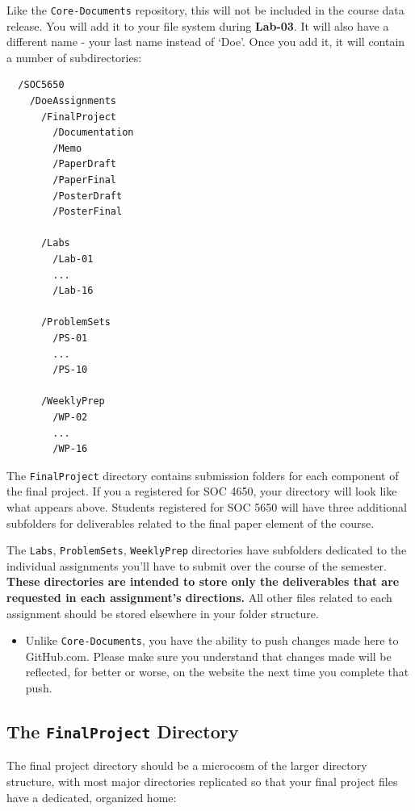 \documentclass[]{book}
\newenvironment{rmdblock}[1]
  {\begin{shaded*}
  \begin{itemize}
  \renewcommand{\labelitemi}{
    \raisebox{-.7\height}[0pt][0pt]{
      {\setkeys{Gin}{width=3em,keepaspectratio}\texttt{[image: images/\#1]}}
    }
  }
  \item
  }
  {
  \end{itemize}
  \end{shaded*}
  }
\newenvironment{rmdwarning}
  {\begin{rmdblock}{warning}}
  {\end{rmdblock}}
\theoremstyle{definition}
\theoremstyle{definition}
\theoremstyle{definition}
\theoremstyle{remark}
\begin{document}
Like the \texttt{Core-Documents} repository, this will not be included
in the course data release. You will add it to your file system during
\textbf{Lab-03}. It will also have a different name - your last name
instead of `Doe'. Once you add it, it will contain a number of
subdirectories:

\begin{verbatim}
  /SOC5650
    /DoeAssignments
      /FinalProject
        /Documentation
        /Memo
        /PaperDraft
        /PaperFinal
        /PosterDraft
        /PosterFinal

      /Labs
        /Lab-01
        ...
        /Lab-16

      /ProblemSets
        /PS-01
        ...
        /PS-10
      
      /WeeklyPrep
        /WP-02
        ...
        /WP-16
\end{verbatim}

The \texttt{FinalProject} directory contains submission folders for each
component of the final project. If you a registered for SOC 4650, your
directory will look like what appears above. Students registered for SOC
5650 will have three additional subfolders for deliverables related to
the final paper element of the course.

The \texttt{Labs}, \texttt{ProblemSets}, \texttt{WeeklyPrep} directories
have subfolders dedicated to the individual assignments you'll have to
submit over the course of the semester. \textbf{These directories are
intended to store only the deliverables that are requested in each
assignment's directions.} All other files related to each assignment
should be stored elsewhere in your folder structure.

\begin{rmdwarning}
Unlike \texttt{Core-Documents}, you have the ability to push changes
made here to GitHub.com. Please make sure you understand that changes
made will be reflected, for better or worse, on the website the next
time you complete that push.
\end{rmdwarning}

\subsection{\texorpdfstring{The \texttt{FinalProject}
Directory}{The FinalProject Directory}}\label{the-finalproject-directory}

The final project directory should be a microcosm of the larger
directory structure, with most major directories replicated so that your
final project files have a dedicated, organized home:
\end{document}

